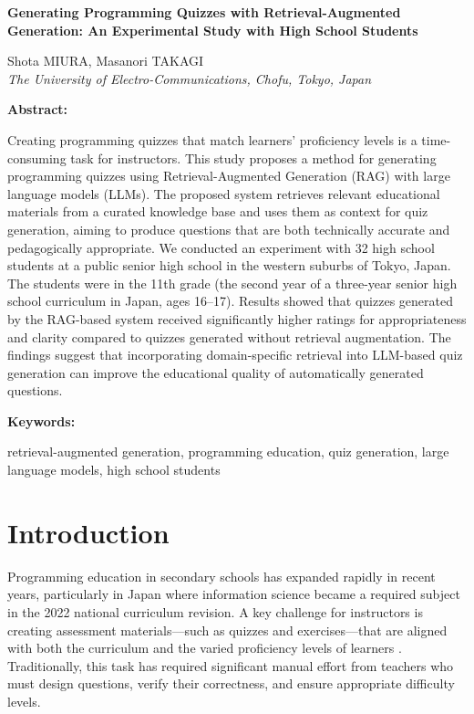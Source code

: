 \documentclass[11pt,a4paper]{article}
\newcommand{\iccetitle}[1]{%
  \begin{center}
    {\fontsize{22pt}{26pt}\selectfont\bfseries #1}%
  \end{center}%
  \vspace{\baselineskip}%
}
\newcommand{\icceauthor}[2]{%
  \begin{center}
    #1 \\ {\itshape #2}%
  \end{center}%
}
\newenvironment{icceabstract}{%
  \begin{list}{}{%
    \setlength{\leftmargin}{0.5in}%
    \setlength{\rightmargin}{0.5in}%
  }%
  \item[]\small\noindent\textbf{Abstract:}\space
}{%
  \end{list}%
}
\newenvironment{iccekeywords}{%
  \vspace{\baselineskip}%
  \begin{list}{}{%
    \setlength{\leftmargin}{0.5in}%
    \setlength{\rightmargin}{0.5in}%
  }%
  \item[]\small\noindent\textbf{Keywords:}\space
}{%
  \end{list}%
  \vspace{2\baselineskip}%
}
\begin{document}
\vspace{\baselineskip}

\iccetitle{Generating Programming Quizzes with Retrieval-Augmented Generation: An Experimental Study with High School Students}

\icceauthor{Shota MIURA, Masanori TAKAGI}%
  {The University of Electro-Communications, Chofu, Tokyo, Japan}

\vspace{\baselineskip}

\begin{icceabstract}
Creating programming quizzes that match learners' proficiency levels is a time-consuming task for instructors. This study proposes a method for generating programming quizzes using Retrieval-Augmented Generation (RAG) with large language models (LLMs). The proposed system retrieves relevant educational materials from a curated knowledge base and uses them as context for quiz generation, aiming to produce questions that are both technically accurate and pedagogically appropriate. We conducted an experiment with 32 high school students at a public senior high school in the western suburbs of Tokyo, Japan. The students were in the 11th grade (the second year of a three-year senior high school curriculum in Japan, ages 16--17). Results showed that quizzes generated by the RAG-based system received significantly higher ratings for appropriateness and clarity compared to quizzes generated without retrieval augmentation. The findings suggest that incorporating domain-specific retrieval into LLM-based quiz generation can improve the educational quality of automatically generated questions.
\end{icceabstract}

\begin{iccekeywords}
retrieval-augmented generation, programming education, quiz generation, large language models, high school students
\end{iccekeywords}


\section{Introduction}

Programming education in secondary schools has expanded rapidly in recent years, particularly in Japan where information science became a required subject in the 2022 national curriculum revision. A key challenge for instructors is creating assessment materials---such as quizzes and exercises---that are aligned with both the curriculum and the varied proficiency levels of learners \parencite{smith2024}. Traditionally, this task has required significant manual effort from teachers who must design questions, verify their correctness, and ensure appropriate difficulty levels.
\end{document}

